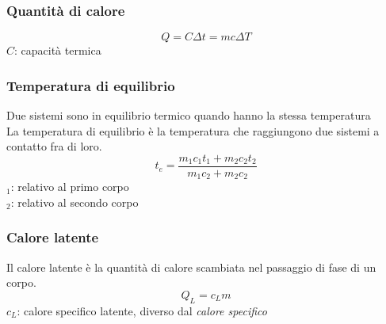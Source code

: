 \subsubsection{Quantità di calore}
\begin{equation*}
Q = C\Delta t = mc\Delta T
\end{equation*}
$C$: capacità termica

\subsubsection{Temperatura di equilibrio}
Due sistemi sono in equilibrio termico quando hanno la stessa temperatura\\
La temperatura di equilibrio è la temperatura che raggiungono due sistemi a contatto fra di loro.
\begin{equation*}
  t_e = \frac{m_1c_1t_1 + m_2c_2t_2}{m_1c_2 + m_2c_2}
\end{equation*}
$_1$: relativo al primo corpo\\
$_2$: relativo al secondo corpo

\subsubsection{Calore latente}
Il calore latente è la quantità di calore scambiata nel passaggio di fase di un corpo.
\begin{equation*}
Q_L = c_Lm
\end{equation*}
$c_L$: calore specifico latente, diverso dal \emph{calore specifico}

